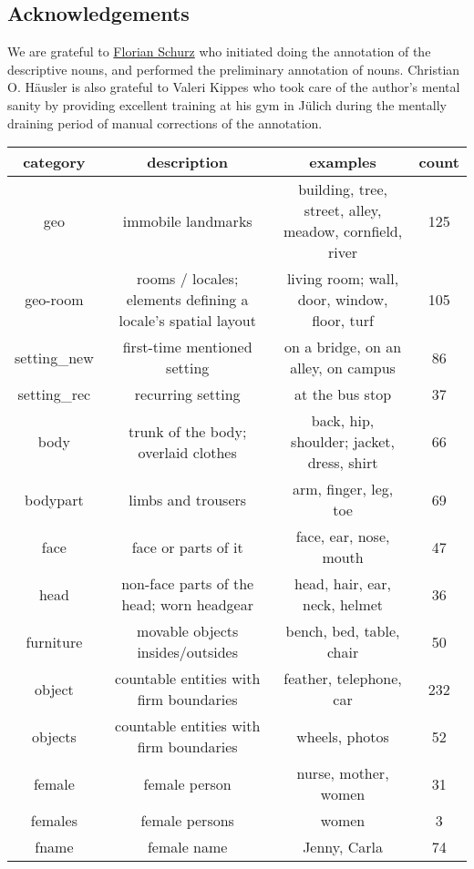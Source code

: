 \documentclass[10pt,a4paper,onecolumn]{article}
\begin{document}
\subsection*{Acknowledgements}
We are grateful to \href{www.florianschurz.de}{Florian Schurz} who initiated doing the annotation of the descriptive nouns, and performed the preliminary annotation of nouns. Christian O. Häusler is also grateful to Valeri Kippes who took care of the author's mental sanity by providing excellent training at his gym in Jülich during the mentally draining period of manual corrections of the annotation.

{\small
}

\clearpage
\begin{center}
\begin{tabular}{ |c|c|c|c| }
\hline
category & description & examples & count\\
\hline
geo & immobile landmarks & building, tree, street, alley, meadow, cornfield, river & 125\\
geo-room & rooms / locales; elements defining a locale's spatial layout & living room; wall, door, window, floor, turf & 105\\
setting\_new & first-time mentioned setting & on a bridge, on an alley, on campus & 86\\
setting\_rec & recurring setting & at the bus stop & 37\\
body & trunk of the body; overlaid clothes & back, hip, shoulder; jacket, dress, shirt & 66\\
bodypart & limbs and trousers & arm, finger, leg, toe & 69\\
face & face or parts of it & face, ear, nose, mouth & 47\\
head & non-face parts of the head; worn headgear & head, hair, ear, neck, helmet & 36\\
furniture & movable objects insides/outsides & bench, bed, table, chair & 50\\
object & countable entities with firm boundaries & feather, telephone, car & 232\\
objects & countable entities with firm boundaries & wheels, photos & 52\\
female & female person & nurse, mother, women & 31\\
females & female persons & women & 3\\
fname & female name & Jenny, Carla & 74\\

\end{tabular}
\end{center}
\end{document}
